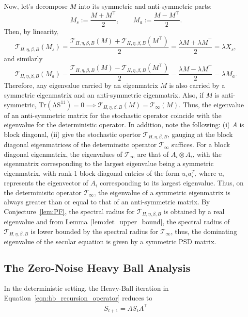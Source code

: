 \documentclass{article}
\newcommand{\kron}{\otimes}
\begin{document}
Now, let's decompose \(M\) into its symmetric and anti-symmetric parts:
\[
M_s:=\frac{M+M^\top}{2},
\qquad
M_a:=\frac{M-M^\top}{2}.
\]
Then, by linearity,
\[
\mathcal{T}_{H,\eta,\beta,B}(M_s)
=
\frac{\mathcal{T}_{H,\eta,\beta,B}(M)+\mathcal{T}_{H,\eta,\beta,B}(M^\top)}{2}
=
\frac{\lambda M+\lambda M^\top}{2}
=
\lambda X_s,
\]
and similarly
\[
\mathcal{T}_{H,\eta,\beta,B}(M_a)
=
\frac{\mathcal{T}_{H,\eta,\beta,B}(M)-\mathcal{T}_{H,\eta,\beta,B}(M^\top)}{2}
=
\frac{\lambda M-\lambda M^\top}{2}
=
\lambda M_a.
\]
Therefore, any eigenvalue carried by an eigenmatrix $M$ is also carried by a symmetric eigenmatrix and an anti-symmetric eigenmatrix. Also, if $M$ is anti-symmetric, $\mathrm{Tr(\Lambda S^{11}) = 0} \implies \mathcal{T}_{H,\eta,\beta,B}(M) = \mathcal{T}_{\infty}(M).$ Thus, the eigenvalue of an anti-symmetric matrix for the stochastic operator coincide with the eigenvalue for the deterministic operator. In addition, note the following: (i) $A$ is block diagonal, (ii) give the stochastic opertor $\mathcal{T}_{H,\eta,\beta,B}$, gauging at the block diagonal eigenmatrices of the determinsitc operator $\mathcal{T}_{\infty}$ suffices. For a  block diagonal eigenmatrix, the eigenvalues of  $\mathcal{T}_{\infty}$ are that of $A_i \kron A_i$, with the eigenmatrix corresponding to the largest eigenvalue being a symmetric eigenmatrix, with rank-1 block diagonal entries of the form $u_i u_i^T$, where $u_i$ represents the eigenvector of $A_i$ corresponding to its largest eigenvalue. Thus, on the determinisitc operator $\mathcal{T}_{\infty}$, the eigenvalue of a symmetric eigenmatrix is always greater than or equal to that of an anti-symmetric matrix. By Conjecture~\ref{lem:PF}, the spectral radius for $\mathcal{T}_{H,\eta,\beta,B}$ is obtained by a real eigenvalue and from Lemma~\ref{lem:det_upper_bound}, the spectral radius of $\mathcal{T}_{H,\eta,\beta,B}$ is lower bounded by the spectral radius for $\mathcal{T}_{\infty}$, thus, the dominating eigenvalue of the secular equation is given by a symmetric PSD matrix.

\subsection{The Zero-Noise Heavy Ball Analysis}
In the deterministic setting, the Heavy-Ball iteration in Equation~\ref{eqn:hb_recursion_operator} reduces to 
\begin{align}
\label{eqn:recur_sigma_t_det}
    S_{t+1} = A S_t A^\top
\end{align}
\end{document}

